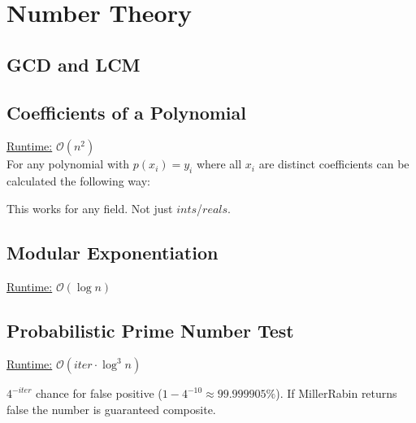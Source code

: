 \section{Number Theory}
\subsection{GCD and LCM}


\subsection{Coefficients of a Polynomial}
\underline{Runtime:} $\mathcal{O}(n^2)$ \\
For any polynomial with $p(x_i) = y_i$ where all $x_i$ are distinct
coefficients can be calculated the following way:

This works for any field. Not just $ints$/$reals$.

\subsection{Modular Exponentiation}
\underline{Runtime:} $\mathcal{O}(\log n)$


\subsection{Probabilistic Prime Number Test}
\underline{Runtime:} $\mathcal{O}(iter \cdot \log^3 n)$

$4^{-iter}$ chance for false positive ($1 - 4^{-10} \approx 99.999905\%$). If MillerRabin returns false the number is guaranteed composite.
